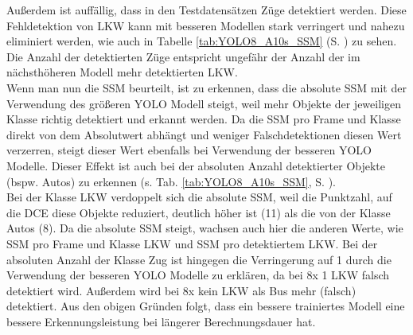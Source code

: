 {{		Außerdem ist auffällig, dass in den Testdatensätzen Züge detektiert werden. Diese Fehldetektion von LKW kann mit besseren Modellen stark verringert und nahezu eliminiert werden, wie auch in Tabelle \ref{tab:YOLO8_A10s_SSM} (S. \pageref{tab:YOLO8_A10s_SSM}) zu sehen. Die Anzahl der detektierten Züge entspricht ungefähr der Anzahl der im nächsthöheren Modell mehr detektierten LKW. \\

		Wenn man nun die SSM beurteilt, ist zu erkennen, dass die absolute SSM mit der Verwendung des größeren YOLO Modell steigt, weil mehr Objekte der jeweiligen Klasse richtig detektiert und erkannt werden. Da die SSM pro Frame und Klasse direkt von dem Absolutwert abhängt und weniger Falschdetektionen diesen Wert verzerren, steigt dieser Wert ebenfalls bei Verwendung der besseren YOLO Modelle. Dieser Effekt ist auch bei der absoluten Anzahl detektierter Objekte (bspw. Autos) zu erkennen (s. Tab. \ref{tab:YOLO8_A10s_SSM}, S. \pageref{tab:YOLO8_A10s_SSM}). \\
		Bei der Klasse LKW verdoppelt sich die absolute SSM, weil die Punktzahl, auf die DCE diese Objekte reduziert, deutlich höher ist (11) als die von der Klasse Autos (8). Da die absolute SSM steigt, wachsen auch hier die anderen Werte, wie SSM pro Frame und Klasse LKW und SSM pro detektiertem LKW. Bei der absoluten Anzahl der Klasse Zug ist hingegen die Verringerung auf 1 durch die Verwendung der besseren YOLO Modelle zu erklären, da bei 8x 1 LKW falsch detektiert wird. Außerdem wird bei 8x kein LKW als Bus mehr (falsch) detektiert. 
		Aus den obigen Gründen folgt, dass ein bessere trainiertes Modell eine bessere Erkennungsleistung bei längerer Berechnungsdauer hat.  \\

}}
